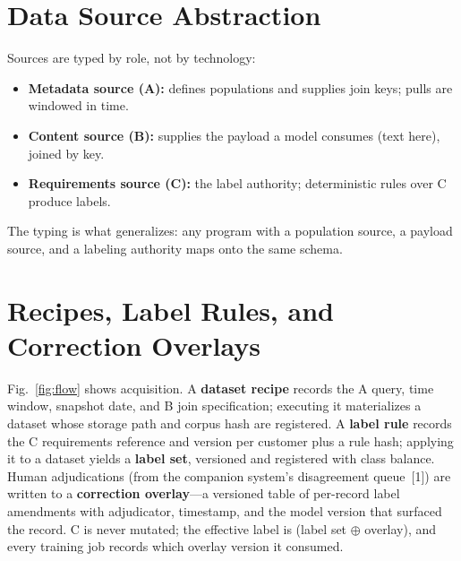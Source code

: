 \documentclass[conference]{IEEEtran}
\begin{document}
\section{Data Source Abstraction}
Sources are typed by role, not by technology:
\begin{itemize}
\item \textbf{Metadata source (A):} defines populations and supplies join keys; pulls are windowed in time.
\item \textbf{Content source (B):} supplies the payload a model consumes (text here), joined by key.
\item \textbf{Requirements source (C):} the label authority; deterministic rules over C produce labels.
\end{itemize}
The typing is what generalizes: any program with a population source, a payload source, and a labeling authority maps onto the same schema.

\section{Recipes, Label Rules, and Correction Overlays}
Fig.~\ref{fig:flow} shows acquisition. A \textbf{dataset recipe} records the A query, time window, snapshot date, and B join specification; executing it materializes a dataset whose storage path and corpus hash are registered. A \textbf{label rule} records the C requirements reference and version per customer plus a rule hash; applying it to a dataset yields a \textbf{label set}, versioned and registered with class balance. Human adjudications (from the companion system's disagreement queue~[1]) are written to a \textbf{correction overlay}---a versioned table of per-record label amendments with adjudicator, timestamp, and the model version that surfaced the record. C is never mutated; the effective label is (label set $\oplus$ overlay), and every training job records which overlay version it consumed.
\end{document}
